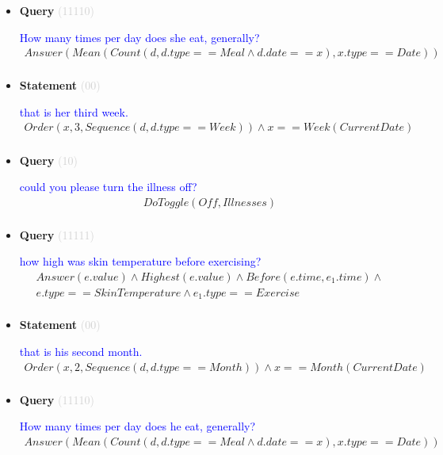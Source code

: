 \documentclass[11pt]{article}
\newcommand{\key}[1]{\textcolor{lightgray}{#1}}
\newcounter{CQuery}
\newcounter{CStatement}
\begin{document}
\begin{itemize}
\item
\textbf{Query\theCQuery} \key{(11110)} \addtocounter{CQuery}{1}
\textcolor{blue}{ How many times per day does she eat, generally? }
\begin{multline*}
Answer(Mean(Count(d, d.type==Meal \wedge d.date==x), x.type==Date)) \\ 
\end{multline*}


\item
\textbf{Statement\theCStatement} \key{(00)} \addtocounter{CStatement}{1}
\textcolor{blue}{ that is her third week. }
\begin{multline*}
Order(x, 3, Sequence(d, d.type==Week)) \wedge x==Week(CurrentDate) \\ 
\end{multline*}


\item
\textbf{Query\theCQuery} \key{(10)} \addtocounter{CQuery}{1}
\textcolor{blue}{ could you please turn the illness off? }
\begin{multline*}
DoToggle(Off, Illnesses) \\ 
\end{multline*}


\item
\textbf{Query\theCQuery} \key{(11111)} \addtocounter{CQuery}{1}
\textcolor{blue}{ how high was skin temperature before exercising? }
\begin{multline*}
Answer(e.value) \wedge Highest(e.value) \wedge Before(e.time, e_1.time) \wedge \\ 
e.type==SkinTemperature \wedge e_1.type==Exercise \\ 
\end{multline*}


\item
\textbf{Statement\theCStatement} \key{(00)} \addtocounter{CStatement}{1}
\textcolor{blue}{ that is his second month. }
\begin{multline*}
Order(x, 2, Sequence(d, d.type==Month)) \wedge x==Month(CurrentDate) \\ 
\end{multline*}


\item
\textbf{Query\theCQuery} \key{(11110)} \addtocounter{CQuery}{1}
\textcolor{blue}{ How many times per day does he eat, generally? }
\begin{multline*}
Answer(Mean(Count(d, d.type==Meal \wedge d.date==x), x.type==Date)) \\ 
\end{multline*}



\end{itemize}
\end{document}
